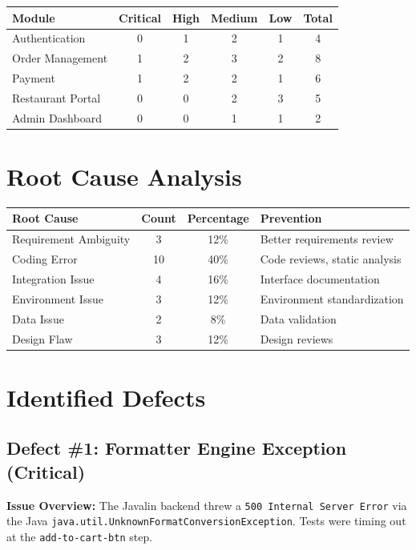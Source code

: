 \documentclass[12pt,a4paper]{report}
\begin{document}
\begin{longtable}{|p{3cm}|c|c|c|c|c|}
\hline
\textbf{Module} & \textbf{Critical} & \textbf{High} & \textbf{Medium} & \textbf{Low} & \textbf{Total} \\
\hline
\endfirsthead
Authentication & 0 & 1 & 2 & 1 & 4 \\
\hline
Order Management & 1 & 2 & 3 & 2 & 8 \\
\hline
Payment & 1 & 2 & 2 & 1 & 6 \\
\hline
Restaurant Portal & 0 & 0 & 2 & 3 & 5 \\
\hline
Admin Dashboard & 0 & 0 & 1 & 1 & 2 \\
\hline
\end{longtable}

\section{Root Cause Analysis}

\begin{longtable}{|p{3.5cm}|c|c|p{4cm}|}
\hline
\textbf{Root Cause} & \textbf{Count} & \textbf{Percentage} & \textbf{Prevention} \\
\hline
\endfirsthead
Requirement Ambiguity & 3 & 12\% & Better requirements review \\
\hline
Coding Error & 10 & 40\% & Code reviews, static analysis \\
\hline
Integration Issue & 4 & 16\% & Interface documentation \\
\hline
Environment Issue & 3 & 12\% & Environment standardization \\
\hline
Data Issue & 2 & 8\% & Data validation \\
\hline
Design Flaw & 3 & 12\% & Design reviews \\
\hline
\end{longtable}

\section{Identified Defects}

\subsection{Defect \#1: Formatter Engine Exception (Critical)}
\textbf{Issue Overview:} 
The Javalin backend threw a \texttt{500 Internal Server Error} via the Java \texttt{java.util.UnknownFormatConversionException}. Tests were timing out at the \texttt{add-to-cart-btn} step.
\end{document}
